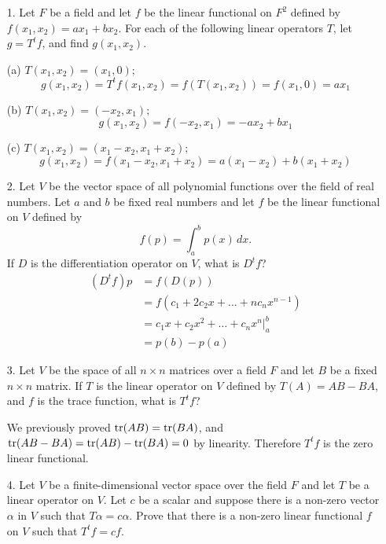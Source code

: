 \documentclass{article}
\begin{document}
\begin{enumerate}[listparindent=\parindent]
\item[1.] Let \(F\) be a field and let \(f\) be the linear functional on \(F^2\) defined by
    \(f(x_1, x_2) = ax_1 + bx_2\). For each of the following linear operators \(T\), let \(g = T^tf\),
    and find \(g(x_1, x_2)\).

    \item[(a)] \(T(x_1, x_2) = (x_1, 0);\)
    \[ g(x_1, x_2) = T^tf(x_1, x_2) = f(T(x_1, x_2)) = f(x_1, 0) = ax_1 \]
    \item[(b)] \(T(x_1, x_2) = (-x_2, x_1);\)
    \[ g(x_1, x_2) = f(-x_2, x_1) = -ax_2 + bx_1 \]
    \item[(c)] \(T(x_1, x_2) = (x_1 - x_2, x_1 + x_2);\)
    \[ g(x_1, x_2) = f(x_1 - x_2, x_1 + x_2) = a(x_1 - x_2) + b(x_1 + x_2) \]

\item[2.] Let \(V\) be the vector space of all polynomial functions over the field of real numbers.
    Let \(a\) and \(b\) be fixed real numbers and let \(f\) be the linear functional on \(V\) defined by
    \[ f(p) = \int^b_a p(x) \, dx. \]
    If \(D\) is the differentiation operator on \(V\), what is \(D^tf\)?
    \begin{align*}
        (D^tf)p &= f(D(p)) \\
                &= f(c_1 + 2c_2x + \dots + nc_nx^{n-1}) \\
                &= c_1x + c_2x^2 + \dots + c_nx^n \rvert^b_a \\
                &= p(b) - p(a)
    \end{align*}

\item[3.] Let \(V\) be the space of all \(n \times n\) matrices over a field \(F\)
    and let \(B\) be a fixed \(n \times n\) matrix. If \(T\) is the linear operator on \(V\) defined by \(T(A) = AB - BA\),
    and \(f\) is the trace function, what is \(T^tf\)?

    We previously proved \(\operatorname{tr}(AB) = \operatorname{tr}(BA)\), and \(\operatorname{tr}(AB - BA) = \operatorname{tr}(AB) - \operatorname{tr}(BA) = 0\) by linearity.
    Therefore \(T^tf\) is the zero linear functional.

\item[4.] Let \(V\) be a finite-dimensional vector space over the field \(F\) and let \(T\) be a linear operator on \(V\).
    Let \(c\) be a scalar and suppose there is a non-zero vector \(\alpha\) in \(V\) such that \(T\alpha = c\alpha\).
    Prove that there is a non-zero linear functional \(f\) on \(V\) such that \(T^tf = cf\).


\end{enumerate}
\end{document}
